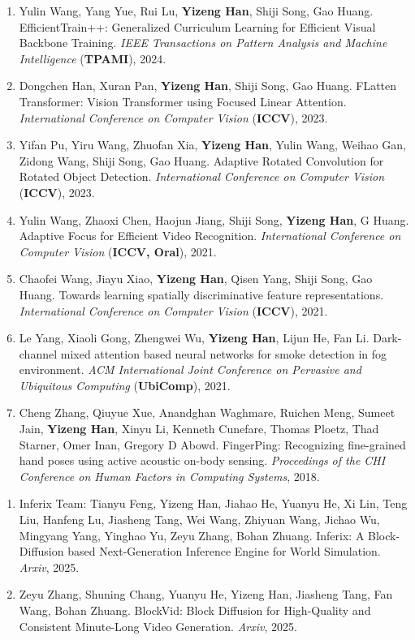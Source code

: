 \documentclass[10.5pt, UTF8]{ctexart}
\makeatletter
\newlength{\bibhang}
\newlength{\bibsep}
 {\@listi \global\bibsep\itemsep \global\advance\bibsep by\parsep}
\newenvironment{bibsection}%
        {\begin{enumerate}{%
       \setlength{\leftmargin}{-2em}%
       \setlength{\itemindent}{-2em}%
       \setlength{\itemsep}{\bibsep}%
        \setlength{\partopsep}{0pt}%
        \setlength{\topsep}{0pt}}}
        {\end{enumerate}\vspace{-.6\baselineskip}}
\renewcommand{\section}[1]{\pagebreak[3]%
    \hyphenpenalty=10000%
    \vspace{1.3\baselineskip}%
    \phantomsection\addcontentsline{toc}{section}{#1}%
    \noindent\llap{\scshape\smash{\parbox[t]{\marginparwidth}{\raggedright #1}}}%
    \vspace{-\baselineskip}\par}
\makeatother
\begin{document}
\begin{sloppypar}
\begin{bibsection}
        \item Yulin Wang, Yang Yue, Rui Lu, \textbf{Yizeng Han}, Shiji Song,  Gao Huang. EfficientTrain++: Generalized Curriculum Learning for Efficient Visual Backbone Training. \emph{IEEE Transactions on Pattern Analysis and Machine Intelligence} (\textbf{TPAMI}), 2024.
        \item Dongchen Han, Xuran Pan, \textbf{Yizeng Han}, Shiji Song, Gao Huang. FLatten Transformer: Vision Transformer using Focused Linear Attention. \emph{International Conference on Computer Vision} (\textbf{ICCV}), 2023.
        \item Yifan Pu, Yiru Wang, Zhuofan Xia, \textbf{Yizeng Han}, Yulin Wang, Weihao Gan, Zidong Wang, Shiji Song, Gao Huang. Adaptive Rotated Convolution for Rotated Object Detection. \emph{International Conference on Computer Vision} (\textbf{ICCV}), 2023.
        \item Yulin Wang, Zhaoxi Chen, Haojun Jiang, Shiji Song, \textbf{Yizeng Han}, G Huang. Adaptive Focus for Efficient Video Recognition. \emph{International Conference on Computer Vision} (\textbf{ICCV, Oral}), 2021.
        \item Chaofei Wang, Jiayu Xiao, \textbf{Yizeng Han}, Qisen Yang, Shiji Song, Gao Huang. Towards learning spatially discriminative feature representations. \emph{International Conference on Computer Vision} (\textbf{ICCV}), 2021.
        \item Le Yang, Xiaoli Gong, Zhengwei Wu, \textbf{Yizeng Han}, Lijun He, Fan Li. Dark-channel mixed attention based neural networks for smoke detection in fog environment. \emph{ACM International Joint Conference on Pervasive and Ubiquitous Computing} (\textbf{UbiComp}), 2021.
        \item Cheng Zhang, Qiuyue Xue, Anandghan Waghmare, Ruichen Meng, Sumeet Jain, \textbf{Yizeng Han}, Xinyu Li, Kenneth Cunefare, Thomas Ploetz, Thad Starner, Omer Inan, Gregory D Abowd. FingerPing: Recognizing fine-grained hand poses using active acoustic on-body sensing. \emph{Proceedings of the CHI Conference on Human Factors in Computing Systems}, 2018.
\end{bibsection}

\section{投稿与预印}
\vspace{-.1275in}
\begin{bibsection}
        \item Inferix Team: Tianyu Feng, Yizeng Han, Jiahao He, Yuanyu He, Xi Lin, Teng Liu, Hanfeng Lu, Jiasheng Tang, Wei Wang, Zhiyuan Wang, Jichao Wu, Mingyang Yang, Yinghao Yu, Zeyu Zhang, Bohan Zhuang. Inferix: A Block-Diffusion based Next-Generation Inference Engine for World Simulation. \emph{Arxiv}, 2025.
        \item Zeyu Zhang, Shuning Chang, Yuanyu He, Yizeng Han, Jiasheng Tang, Fan Wang, Bohan Zhuang. BlockVid: Block Diffusion for High-Quality and Consistent Minute-Long Video Generation. \emph{Arxiv}, 2025.
\end{bibsection}


\end{sloppypar}
\end{document}
